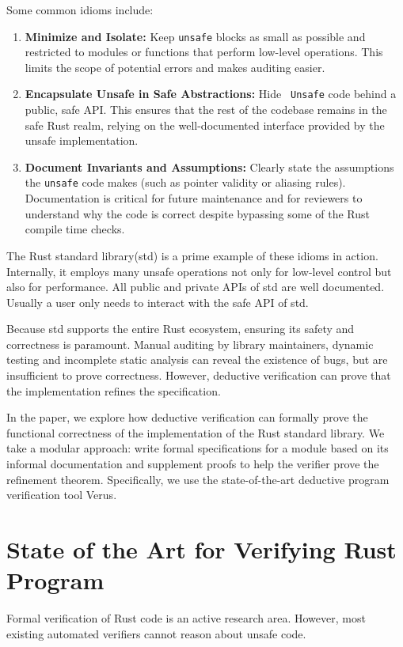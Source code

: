 \documentclass[conference]{IEEEtran}
\begin{document}
Some common idioms include:
\begin{enumerate}
    \item \textbf{Minimize and Isolate:} Keep \texttt{unsafe} blocks as small as possible and restricted to modules or functions that perform low-level operations. This limits the scope of potential errors and makes auditing easier.
    \item \textbf{Encapsulate Unsafe in Safe Abstractions:} Hide \texttt{ Unsafe} code behind a public, safe API. This ensures that the rest of the codebase remains in the safe Rust realm, relying on the well-documented interface provided by the unsafe implementation.
    \item \textbf{Document Invariants and Assumptions:} Clearly state the assumptions the \texttt{unsafe} code makes (such as pointer validity or aliasing rules). Documentation is critical for future maintenance and for reviewers to understand why the code is correct despite bypassing some of the Rust compile time checks.
\end{enumerate}


The Rust standard library(std) is a prime example of these idioms in action. Internally, it employs many unsafe operations not only for low-level control but also for performance. All public and private APIs of std are well documented. Usually a user only needs to interact with the safe API of std.  


Because std supports the entire Rust ecosystem, ensuring its safety and correctness is paramount. Manual auditing by library maintainers, dynamic testing and incomplete static analysis can reveal the existence of bugs, but are insufficient to prove correctness. However, deductive verification can prove that the implementation refines the specification.           


In the paper, we explore how deductive verification can formally prove the functional correctness of the implementation of the Rust standard library. We take a modular approach: write formal specifications for a module based on its informal documentation and supplement proofs to help the verifier prove the refinement theorem. Specifically, we use the state-of-the-art deductive program verification tool Verus\cite{verus}. 
        
\section{State of the Art for Verifying Rust Program}
Formal verification of Rust code is an active research area. However, most existing automated verifiers cannot reason about unsafe code. 
\end{document}
